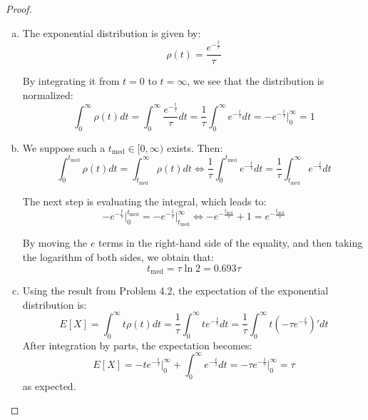 \begin{proof}
\hfill
    \begin{enumerate}[(a)]
        \item The exponential distribution is given by:
            \begin{equation*}\tag{4.27}
                \rho(t) = \frac{e^{-\frac{t}{\tau}}}{\tau}
            \end{equation*}

        By integrating it from $t = 0$ to $t = \infty$, we see that the distribution is
        normalized:
        \[
            \int_{0}^{\infty} \rho(t) dt
            = \int_{0}^{\infty} \frac{e^{-\frac{t}{\tau}}}{\tau} dt
            = \frac{1}{\tau} \int_{0}^{\infty} e^{-\frac{t}{\tau}} dt
            = -e^{-\frac{t}{\tau}}\bigg|_{0}^{\infty} 
            = 1
        \] 

        \item We suppose such a $t_{\text{med}} \in [0, \infty)$ exists. Then:
            \[
                \int_{0}^{t_\text{med}} \rho(t) dt = \int_{t_\text{med}}^{\infty} \rho(t) dt 
                \iff \frac{1}{\tau}\int_0^{t_\text{med}} e^{-\frac{t}{\tau}} dt
                    = \frac{1}{\tau}\int_{t_\text{med}}^\infty e^{-\frac{t}{\tau}} dt
            \] 

        The next step is evaluating the integral, which leads to:
        \[
            -e^{-\frac{t}{\tau}}\bigg|_{0}^{t_\text{med}} 
            = -e^{-\frac{t}{\tau}}\bigg|_{t_\text{med}}^{\infty} 
            \iff -e^{-\frac{t_\text{med}}{\tau}} + 1 = e^{-\frac{t_\text{med}}{\tau}}
        \] 

        By moving the $e$ terms in the right-hand side of the equality, and then
        taking the logarithm of both sides, we obtain that:
        \[
            t_\text{med} = \tau \ln 2 = 0.693 \tau
        \]

        \item Using the result from Problem 4.2, the expectation of the exponential
            distribution is:
            \[
                E[X] = \int_{0}^{\infty} t \rho(t) dt 
                = \frac{1}{\tau}\int_{0}^{\infty} t e^{-\frac{t}{\tau}} dt
                = \frac{1}{\tau}\int_{0}^{\infty} t (-\tau e^{-\frac{t}{\tau}})' dt
            \] 
        After integration by parts, the expectation becomes:
        \[
            E[X] = -te^{-\frac{t}{\tau}}\bigg|_{0}^{\infty} + \int_0^\infty e^{-\frac{t}{\tau}} dt
            = -\tau e^{-\frac{t}{\tau}} \bigg|_{0}^{\infty} = \tau
        \] 
        as expected.


\end{enumerate}
\end{proof}
